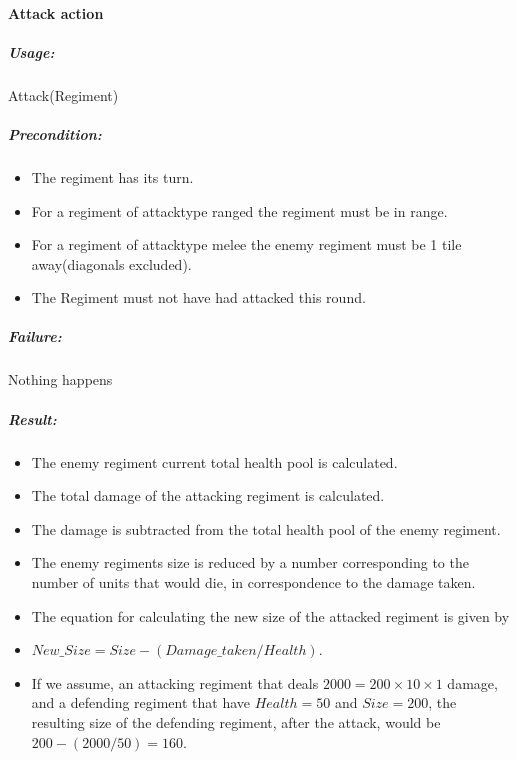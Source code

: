 		\paragraph{Attack action}
		\subparagraph{Usage:} 
		Attack(Regiment) \\
		
		\subparagraph{Precondition:} 
		\begin{itemize}\itemsep0.0001cm
		\item The regiment has its turn. \\
		\item For a regiment of attacktype ranged the regiment must be in range. \\
		\item For a regiment of attacktype melee the enemy regiment must be 1 tile away(diagonals excluded). \\
		\item The Regiment must not have had attacked this round.\\
		\end{itemize}
		\subparagraph{Failure:} 
		Nothing happens \\
		
		\subparagraph{Result:}
		\begin{itemize} 
		\item The enemy regiment current total health pool is calculated.\\ 
		\item The total damage of the attacking regiment is calculated. \\
		\item The damage is subtracted from the total health pool of the enemy regiment.\\
		\item The enemy regiments size is reduced by a number corresponding to the number of units that would die, in correspondence to the damage taken.\\
		\item The equation for calculating the new size of the attacked regiment is given by \\
		\item $New\_Size = Size - (Damage\_taken / Health)$.
		\item If we assume, an attacking regiment that deals $2000 = 200 \times 10 \times 1$ damage, and a defending regiment that have $Health = 50$ and $Size = 200$, the resulting size of the defending regiment, after the attack, would be $200-(2000/50)=160$.
		\end{itemize}
